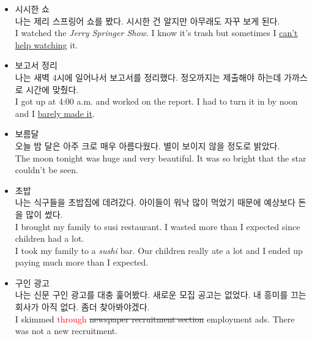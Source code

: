 \begin{itemize}
  \item 시시한 쇼\\
  
  나는 제리 스프링어 쇼를 봤다. 시시한 건 알지만 아무래도 자꾸 보게 된다.\\
  
  I watched the \textit{Jerry Springer Show}. I know it's trash but sometimes I \underline{can't help watching} it.\\
  
  \item 보고서 정리\\
  
  나는 새벽 4시에 일어나서 보고서를 정리했다. 정오까지는 제출해야 하는데 가까스로 시간에 맞췄다.\\
  
  I got up at 4:00 a.m. and worked on the report. I had to turn it in by noon and I \underline{barely made it}.\\
  
  \item 보름달\\
  
  오늘 밤 달은 아주 크로 매우 아름다웠다. 별이 보이지 않을 정도로 밝았다.\\
  
  The moon tonight was huge and very beautiful. It was so bright that the star couldn't be seen.\\
  
  \item 초밥\\
  
  나는 식구들을 초밥집에 데려갔다. 아이들이 워낙 많이 먹었기 때문에 예상보다 돈을 많이 썼다.\\
  
  I brought my family to susi restaurant. I wasted more than I expected since children had a lot.\\
  
  I took my family to a \textit{sushi} bar. Our children really ate a lot and I ended up paying much more than I expected.\\
  
  \item 구인 광고\\
  
  나는 신문 구인 광고를 대충 훑어봤다. 새로운 모집 공고는 없었다. 내 흥미를 끄는 회사가 아직 없다. 좀더 찾아봐야겠다.\\
  
  I skimmed \textcolor{red}{through} \sout{newspaper recruitment section} employment ads. There was not a new recruitment. \\
  

\end{itemize}
